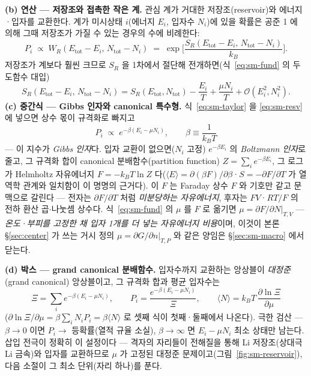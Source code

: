 \documentclass[11pt,a4paper]{article}
\begin{document}
\textbf{(b) 연산 --- 저장조와 접촉한 작은 계.} 관심 계가 거대한 저장조(reservoir)와 에너지·입자를 교환한다.
계가 미시상태 $i$(에너지 $E_i$, 입자수 $N_i$)에 있을 확률은 공준 1 에 의해 그때 저장조가 가질 수 있는 경우의
수에 비례한다:
\begin{equation}
P_i\;\propto\;W_R(E_\mathrm{tot}-E_i,\,N_\mathrm{tot}-N_i)
\;=\;\exp\!\Big[\frac{S_R(E_\mathrm{tot}-E_i,\,N_\mathrm{tot}-N_i)}{k_B}\Big].
\label{eq:sm-resv}
\end{equation}
저장조가 계보다 훨씬 크므로 $S_R$ 을 1차에서 절단해 전개하면(식~\eqref{eq:sm-fund} 의 두 도함수 대입)
\begin{equation}
S_R(E_\mathrm{tot}-E_i,\,N_\mathrm{tot}-N_i)
= S_R(E_\mathrm{tot},N_\mathrm{tot})-\frac{E_i}{T}+\frac{\mu N_i}{T}+\mathcal O(E_i^2,N_i^2).
\label{eq:sm-taylor}
\end{equation}
\textbf{(c) 중간식 --- Gibbs 인자와 canonical 특수형.} 식~\eqref{eq:sm-taylor} 을 \eqref{eq:sm-resv} 에 넣으면
상수 몫이 규격화로 빠지고
\begin{equation}
P_i\;\propto\;e^{-\beta(E_i-\mu N_i)},\qquad \beta\equiv\frac{1}{k_BT}
\label{eq:sm-gibbsfactor}
\end{equation}
--- 이 지수가 \emph{Gibbs 인자}다. 입자 교환이 없으면($N_i$ 고정) $e^{-\beta E_i}$ 의 \emph{Boltzmann 인자}로
줄고, 그 규격화 합이 canonical 분배함수(partition function) $Z=\sum_ie^{-\beta E_i}$, 그 로그가 Helmholtz
자유에너지 $F=-k_BT\ln Z$ 다($\langle E\rangle=\partial(\beta F)/\partial\beta$·$S=-\partial F/\partial T$ 가
열역학 관계와 일치함이 이 명명의 근거다). 이 $F$ 는 Faraday 상수 $F$ 와 기호만 같고 문맥으로 갈린다 —
전자는 $\partial F/\partial T$ 처럼 \emph{미분당하는 자유에너지}, 후자는 $FV$·$RT/F$ 의 전하 환산
곱$\cdot$나눗셈 상수다. 식~\eqref{eq:sm-fund} 의 $\mu$ 를 $F$ 로 옮기면
$\mu=\partial F/\partial N|_{T,V}$ --- \emph{온도·부피를 고정한 채 입자 1개를 더 넣는 자유에너지 비용}이며,
이것이 본론 \S\ref{sec:center} 가 쓰는 거시 정의 $\mu=\partial G/\partial n|_{T,P}$ 와 같은 양임은
\S\ref{sec:sm-macro} 에서 닫는다.

\textbf{(d) 박스 --- grand canonical 분배함수.} 입자수까지 교환하는 앙상블이
\emph{대정준}(grand canonical) 앙상블이고, 그 규격화 합과 평균 입자수는
\begin{equation}
\boxed{\;\Xi=\sum_i e^{-\beta(E_i-\mu N_i)},\qquad
P_i=\frac{e^{-\beta(E_i-\mu N_i)}}{\Xi},\qquad
\langle N\rangle=k_BT\,\frac{\partial\ln\Xi}{\partial\mu}\;}
\label{eq:sm-gc}
\end{equation}
($\partial\ln\Xi/\partial\mu=\beta\sum_iN_iP_i=\beta\langle N\rangle$ 로 셋째 식이 첫째·둘째에서 나온다).
극한 검산 --- $\beta\to0$ 이면 $P_i\to$ 등확률(열적 규율 소실), $\beta\to\infty$ 면 $E_i-\mu N_i$ 최소 상태만
남는다. 삽입 전극이 정확히 이 설정이다 --- 격자의 자리들이 전해질을 통해 Li 저장조(상대극 Li 금속)와 입자를
교환하므로 $\mu$ 가 고정된 대정준 문제이고(그림~\ref{fig:sm-reservoir}), 다음 소절이 그 최소 단위(자리
하나)를 푼다.
\end{document}
